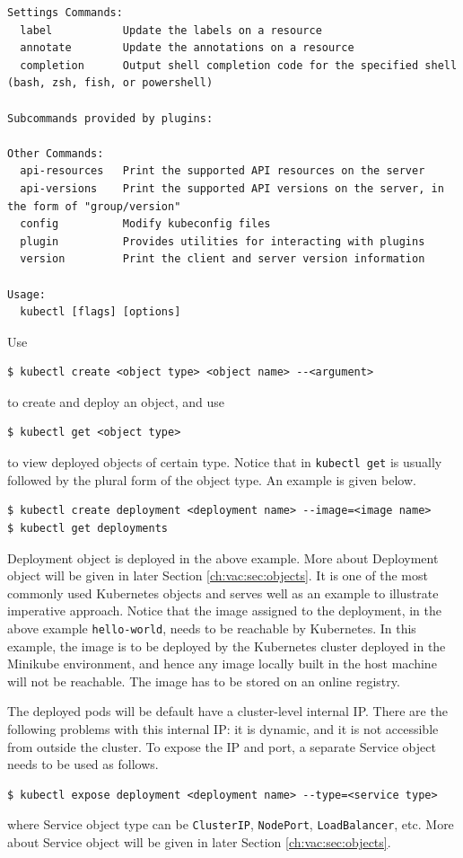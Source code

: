 \begin{lstlisting}
Settings Commands:
  label           Update the labels on a resource
  annotate        Update the annotations on a resource
  completion      Output shell completion code for the specified shell (bash, zsh, fish, or powershell)

Subcommands provided by plugins:

Other Commands:
  api-resources   Print the supported API resources on the server
  api-versions    Print the supported API versions on the server, in the form of "group/version"
  config          Modify kubeconfig files
  plugin          Provides utilities for interacting with plugins
  version         Print the client and server version information

Usage:
  kubectl [flags] [options]
\end{lstlisting}

Use
\begin{lstlisting}
$ kubectl create <object type> <object name> --<argument>
\end{lstlisting}
to create and deploy an object, and use
\begin{lstlisting}
$ kubectl get <object type>
\end{lstlisting}
to view deployed objects of certain type. Notice that in \verb|kubectl get| is usually followed by the plural form of the object type. An example is given below.
\begin{lstlisting}
$ kubectl create deployment <deployment name> --image=<image name>
$ kubectl get deployments
\end{lstlisting}
Deployment object is deployed in the above example. More about Deployment object will be given in later Section \ref{ch:vac:sec:objects}. It is one of the most commonly used Kubernetes objects and serves well as an example to illustrate imperative approach. Notice that the image assigned to the deployment, in the above example \texttt{hello-world}, needs to be reachable by Kubernetes. In this example, the image is to be deployed by the Kubernetes cluster deployed in the Minikube environment, and hence any image locally built in the host machine will not be reachable. The image has to be stored on an online registry.

The deployed pods will be default have a cluster-level internal IP. There are the following problems with this internal IP: it is dynamic, and it is not accessible from outside the cluster. To expose the IP and port, a separate Service object needs to be used as follows.
\begin{lstlisting}
$ kubectl expose deployment <deployment name> --type=<service type>
\end{lstlisting}
where Service object type can be \verb|ClusterIP|, \verb|NodePort|, \verb|LoadBalancer|, etc. More about Service object will be given in later Section \ref{ch:vac:sec:objects}.

